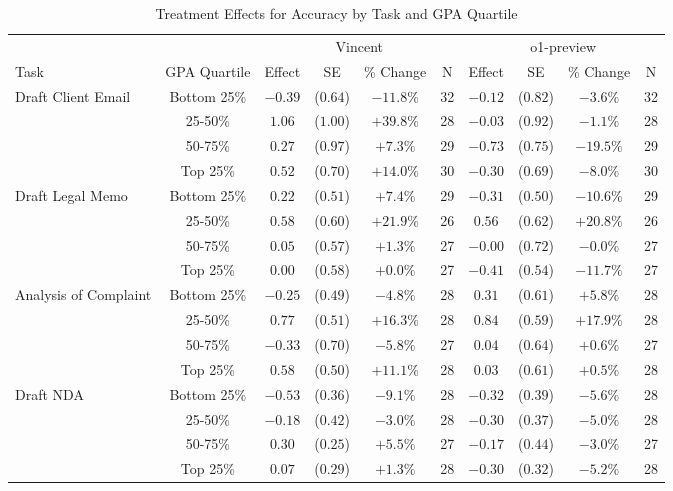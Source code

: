 \begin{table}[!htbp]
\centering
\caption{Treatment Effects for Accuracy by Task and GPA Quartile}
\label{tab:accuracy_gpa}
\begin{tabular}{lccccccccc}
\hline\hline
& & \multicolumn{4}{c}{Vincent} & \multicolumn{4}{c}{o1-preview} \\
\cline{3-10}
Task & GPA Quartile & Effect & SE & \% Change & N & Effect & SE & \% Change & N \\
\hline
\multirow{4}{*}{Draft Client Email} & Bottom 25\% & $-0.39$ & ($0.64$) & $-11.8\%$ & 32 & $-0.12$ & ($0.82$) & $-3.6\%$ & 32 \\
& 25-50\% & $1.06$ & ($1.00$) & $+39.8\%$ & 28 & $-0.03$ & ($0.92$) & $-1.1\%$ & 28 \\
& 50-75\% & $0.27$ & ($0.97$) & $+7.3\%$ & 29 & $-0.73$ & ($0.75$) & $-19.5\%$ & 29 \\
& Top 25\% & $0.52$ & ($0.70$) & $+14.0\%$ & 30 & $-0.30$ & ($0.69$) & $-8.0\%$ & 30 \\
\hline
\multirow{4}{*}{Draft Legal Memo} & Bottom 25\% & $0.22$ & ($0.51$) & $+7.4\%$ & 29 & $-0.31$ & ($0.50$) & $-10.6\%$ & 29 \\
& 25-50\% & $0.58$ & ($0.60$) & $+21.9\%$ & 26 & $0.56$ & ($0.62$) & $+20.8\%$ & 26 \\
& 50-75\% & $0.05$ & ($0.57$) & $+1.3\%$ & 27 & $-0.00$ & ($0.72$) & $-0.0\%$ & 27 \\
& Top 25\% & $0.00$ & ($0.58$) & $+0.0\%$ & 27 & $-0.41$ & ($0.54$) & $-11.7\%$ & 27 \\
\hline
\multirow{4}{*}{Analysis of Complaint} & Bottom 25\% & $-0.25$ & ($0.49$) & $-4.8\%$ & 28 & $0.31$ & ($0.61$) & $+5.8\%$ & 28 \\
& 25-50\% & $0.77$ & ($0.51$) & $+16.3\%$ & 28 & $0.84$ & ($0.59$) & $+17.9\%$ & 28 \\
& 50-75\% & $-0.33$ & ($0.70$) & $-5.8\%$ & 27 & $0.04$ & ($0.64$) & $+0.6\%$ & 27 \\
& Top 25\% & $0.58$ & ($0.50$) & $+11.1\%$ & 28 & $0.03$ & ($0.61$) & $+0.5\%$ & 28 \\
\hline
\multirow{4}{*}{Draft NDA} & Bottom 25\% & $-0.53$ & ($0.36$) & $-9.1\%$ & 28 & $-0.32$ & ($0.39$) & $-5.6\%$ & 28 \\
& 25-50\% & $-0.18$ & ($0.42$) & $-3.0\%$ & 28 & $-0.30$ & ($0.37$) & $-5.0\%$ & 28 \\
& 50-75\% & $0.30$ & ($0.25$) & $+5.5\%$ & 27 & $-0.17$ & ($0.44$) & $-3.0\%$ & 27 \\
& Top 25\% & $0.07$ & ($0.29$) & $+1.3\%$ & 28 & $-0.30$ & ($0.32$) & $-5.2\%$ & 28 \\

\end{tabular}
\end{table}
